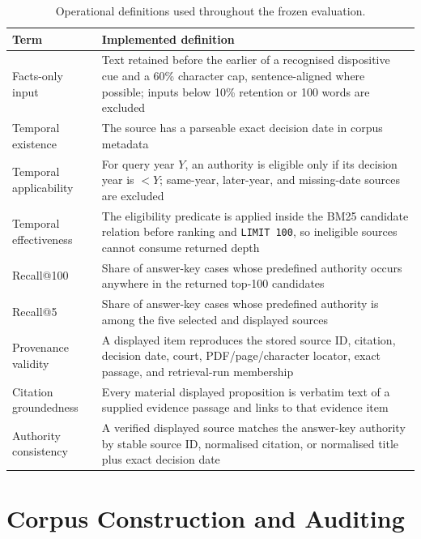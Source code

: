 \documentclass[conference]{IEEEtran}
\begin{document}
\begin{table}[t]
\caption{Operational definitions used throughout the frozen evaluation.}
\label{tab:defs}
\centering
\footnotesize
\begin{tabular}{p{2.35cm}p{5.5cm}}
\toprule
\textbf{Term} & \textbf{Implemented definition} \\
\midrule
Facts-only input &
Text retained before the earlier of a recognised dispositive cue and a 60\%
character cap, sentence-aligned where possible; inputs below 10\% retention or
100 words are excluded \\
\addlinespace
Temporal existence &
The source has a parseable exact decision date in corpus metadata \\
\addlinespace
Temporal applicability &
For query year $Y$, an authority is eligible only if its decision year is
$< Y$; same-year, later-year, and missing-date sources are excluded \\
\addlinespace
Temporal effectiveness &
The eligibility predicate is applied inside the BM25 candidate relation before
ranking and \texttt{LIMIT 100}, so ineligible sources cannot consume returned
depth \\
\addlinespace
Recall@100 &
Share of answer-key cases whose predefined authority occurs anywhere in the
returned top-100 candidates \\
\addlinespace
Recall@5 &
Share of answer-key cases whose predefined authority is among the five selected
and displayed sources \\
\addlinespace
Provenance validity &
A displayed item reproduces the stored source ID, citation, decision date,
court, PDF/page/character locator, exact passage, and retrieval-run membership \\
\addlinespace
Citation groundedness &
Every material displayed proposition is verbatim text of a supplied evidence
passage and links to that evidence item \\
\addlinespace
Authority consistency &
A verified displayed source matches the answer-key authority by stable source
ID, normalised citation, or normalised title plus exact decision date \\
\bottomrule
\end{tabular}
\end{table}

\section{Corpus Construction and Auditing}
\end{document}
